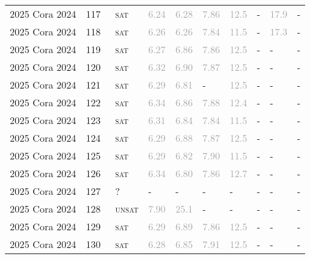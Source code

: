 \begin{center}
{\begin{longtable}{@{}llllllllll@{}}
2025 Cora 2024 & 117 & ~\textsc{sat} & \textcolor{darkgray}{6.24} & \textcolor{darkgray}{6.28} & \textcolor{darkgray}{7.86} & \textcolor{darkgray}{12.5} & - & \textcolor{darkgray}{17.9} & - \\
2025 Cora 2024 & 118 & ~\textsc{sat} & \textcolor{darkgray}{6.26} & \textcolor{darkgray}{6.26} & \textcolor{darkgray}{7.84} & \textcolor{darkgray}{11.5} & - & \textcolor{darkgray}{17.3} & - \\
2025 Cora 2024 & 119 & ~\textsc{sat} & \textcolor{darkgray}{6.27} & \textcolor{darkgray}{6.86} & \textcolor{darkgray}{7.86} & \textcolor{darkgray}{12.5} & - & - & - \\
2025 Cora 2024 & 120 & ~\textsc{sat} & \textcolor{darkgray}{6.32} & \textcolor{darkgray}{6.90} & \textcolor{darkgray}{7.87} & \textcolor{darkgray}{12.5} & - & - & - \\
2025 Cora 2024 & 121 & ~\textsc{sat} & \textcolor{darkgray}{6.29} & \textcolor{darkgray}{6.81} & - & \textcolor{darkgray}{12.5} & - & - & - \\
2025 Cora 2024 & 122 & ~\textsc{sat} & \textcolor{darkgray}{6.34} & \textcolor{darkgray}{6.86} & \textcolor{darkgray}{7.88} & \textcolor{darkgray}{12.4} & - & - & - \\
2025 Cora 2024 & 123 & ~\textsc{sat} & \textcolor{darkgray}{6.31} & \textcolor{darkgray}{6.84} & \textcolor{darkgray}{7.84} & \textcolor{darkgray}{11.5} & - & - & - \\
2025 Cora 2024 & 124 & ~\textsc{sat} & \textcolor{darkgray}{6.29} & \textcolor{darkgray}{6.88} & \textcolor{darkgray}{7.87} & \textcolor{darkgray}{12.5} & - & - & - \\
2025 Cora 2024 & 125 & ~\textsc{sat} & \textcolor{darkgray}{6.29} & \textcolor{darkgray}{6.82} & \textcolor{darkgray}{7.90} & \textcolor{darkgray}{11.5} & - & - & - \\
2025 Cora 2024 & 126 & ~\textsc{sat} & \textcolor{darkgray}{6.34} & \textcolor{darkgray}{6.80} & \textcolor{darkgray}{7.86} & \textcolor{darkgray}{12.7} & - & - & - \\
2025 Cora 2024 & 127 & ~? & - & - & - & - & - & - & - \\
2025 Cora 2024 & 128 & ~\textsc{unsat} & \textcolor{darkgray}{7.90} & \textcolor{darkgray}{25.1} & - & - & - & - & - \\
2025 Cora 2024 & 129 & ~\textsc{sat} & \textcolor{darkgray}{6.29} & \textcolor{darkgray}{6.89} & \textcolor{darkgray}{7.86} & \textcolor{darkgray}{12.5} & - & - & - \\
2025 Cora 2024 & 130 & ~\textsc{sat} & \textcolor{darkgray}{6.28} & \textcolor{darkgray}{6.85} & \textcolor{darkgray}{7.91} & \textcolor{darkgray}{12.5} & - & - & - \\

\end{longtable}}
\end{center}

